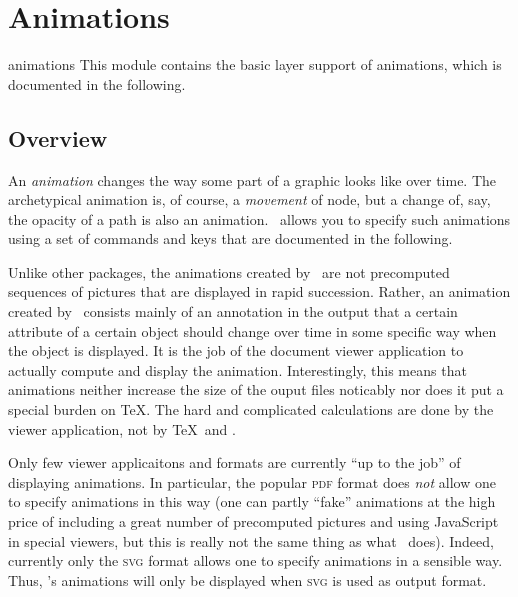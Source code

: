 %
%
%


\section{Animations}

\label{section-base-animations}

\begin{pgfmodule}{animations}
  This module contains the basic layer support of animations, which is
  documented in the following. 
\end{pgfmodule}


\subsection{Overview}

An \emph{animation} changes the way some part of a graphic looks like
over time. The archetypical animation is, of course, a \emph{movement}
of node, but a change of, say, the opacity of a path is also an
animation. \pgfname\ allows you to specify such animations using a set
of commands and keys that are documented in the following.

Unlike other packages, the animations created by \pgfname\ are not
precomputed sequences of pictures that are displayed in rapid
succession. Rather, an animation created by \pgfname\ consists mainly
of an annotation in the output that a certain attribute of a certain
object should change over time in some specific way when the object is
displayed. It is the job of the document viewer application to
actually compute and display the animation. Interestingly, this means
that animations neither increase the size of the ouput files noticably
nor does it put a special burden on \TeX. The hard and complicated
calculations are done by the viewer application, not by \TeX\ and
\pgfname. 

Only few viewer applicaitons and formats are currently ``up to the
job'' of displaying animations.  In particular, 
the popular \textsc{pdf} format does \emph{not} allow one to specify
animations in this way (one can partly ``fake'' animations at the
high price of including a great number of precomputed pictures and
using JavaScript in special viewers, but this is really not the same
thing as what \pgfname\ does). Indeed, currently only the  \textsc{svg}
format allows one to specify animations in a sensible way. Thus,
\pgfname's animations will only be displayed when \textsc{svg} is used
as output format.


